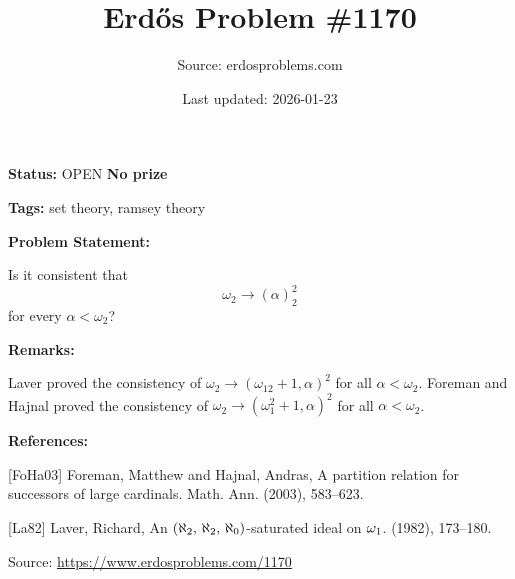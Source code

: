 \documentclass{article}
\title{Erd\H{o}s Problem \#1170}
\date{Last updated: 2026-01-23}
\author{Source: erdosproblems.com}
\begin{document}
\maketitle

\noindent\textbf{Status:} OPEN \quad \textbf{No prize}

\noindent\textbf{Tags:} set theory, ramsey theory

\medskip
\noindent\textbf{Problem Statement:}

Is it consistent that\[\omega_2\to (\alpha)_2^2\]for every $\alpha <\omega_2$?

\bigskip
\noindent\textbf{Remarks:}

Laver \cite{La82} proved the consistency of $\omega_2\to (\omega_12+1,\alpha)^2$ for all $\alpha<\omega_2$. Foreman and Hajnal \cite{FoHa03} proved the consistency of $\omega_2\to (\omega_1^2+1,\alpha)^2$ for all $\alpha<\omega_2$.

\bigskip
\noindent\textbf{References:}

[FoHa03] Foreman, Matthew and Hajnal, Andras, A partition relation for successors of large cardinals. Math. Ann. (2003), 583--623.
 
 [La82] Laver, Richard, An {$(\aleph \sb{2},\,\aleph \sb{2},\,\aleph
\sb{0})$}-saturated ideal on {$\omega \sb{1}$}. (1982), 173--180.

\bigskip
\noindent\small{Source: \url{https://www.erdosproblems.com/1170}}
\end{document}
